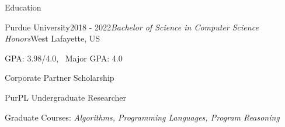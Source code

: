 \documentclass{resume} %
\begin{document}
 

\vspace{-6.0em}
\begin{rSection}{Education}

\begin{rSubsection}{Purdue University}{2018 - 2022}{\textit{Bachelor of Science in Computer Science Honors}}{West Lafayette, US}
\item GPA: 3.98/4.0, \ Major GPA: 4.0
\item Corporate Partner Scholarship
\item PurPL Undergraduate Researcher
\item Graduate Courses: \it Algorithms, Programming Languages,
Program Reasoning
\end{rSubsection}

\end{rSection}

\end{document}
